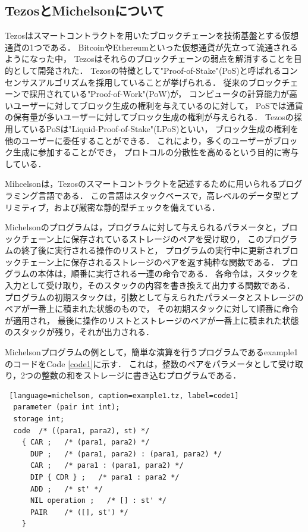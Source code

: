 \documentclass{kuisthesis}
\begin{document}
\subsection{TezosとMichelsonについて}\label{subsec-pre-tezos}
Tezosはスマートコントラクトを用いたブロックチェーンを技術基盤とする仮想通貨の1つである．
BitcoinやEthereumといった仮想通貨が先立って流通されるようになった中，
Tezosはそれらのブロックチェーンの弱点を解消することを目的として開発された．
Tezosの特徴として"Proof-of-Stake"(PoS)と呼ばれるコンセンサスアルゴリズムを採用していることが挙げられる．
従来のブロックチェーンで採用されている"Proof-of-Work"(PoW)が，
コンピュータの計算能力が高いユーザーに対してブロック生成の権利を与えているのに対して，
PoSでは通貨の保有量が多いユーザーに対してブロック生成の権利が与えられる．
Tezosの採用しているPoSは"Liquid-Proof-of-Stake"(LPoS)といい，
ブロック生成の権利を他のユーザーに委任することができる．
これにより，多くのユーザーがブロック生成に参加することができ，
プロトコルの分散性を高めるという目的に寄与している．

Mihcelsonは，Tezosのスマートコントラクトを記述するために用いられるプログラミング言語である．
この言語はスタックベースで，高レベルのデータ型とプリミティブ，および厳密な静的型チェックを備えている．

Michelsonのプログラムは，プログラムに対して与えられるパラメータと，ブロックチェーン上に保存されているストレージのペアを受け取り，
このプログラムの終了後に実行される操作のリストと，
プログラムの実行中に更新されブロックチェーン上に保存されるストレージのペアを返す純粋な関数である．
プログラムの本体は，順番に実行される一連の命令である．
各命令は，スタックを入力として受け取り，そのスタックの内容を書き換えて出力する関数である．
プログラムの初期スタックは，引数として与えられたパラメータとストレージのペアが一番上に積まれた状態のもので，
その初期スタックに対して順番に命令が適用され，
最後に操作のリストとストレージのペアが一番上に積まれた状態のスタックが残り，それが出力される．

Michelsonプログラムの例として，簡単な演算を行うプログラムであるexample1のコードをCode \ref{code1}に示す．
これは，整数のペアをパラメータとして受け取り，2つの整数の和をストレージに書き込むプログラムである．
\\
\begin{lstlisting} [language=michelson, caption=example1.tz, label=code1]
  parameter (pair int int); 
  storage int;
  code  /* ((para1, para2), st) */
    { CAR ;   /* (para1, para2) */
      DUP ;   /* (para1, para2) : (para1, para2) */
      CAR ;   /* para1 : (para1, para2) */
      DIP { CDR } ;   /* para1 : para2 */
      ADD ;   /* st' */
      NIL operation ;   /* [] : st' */
      PAIR    /* ([], st') */
    }
\end{lstlisting}
\end{document}
